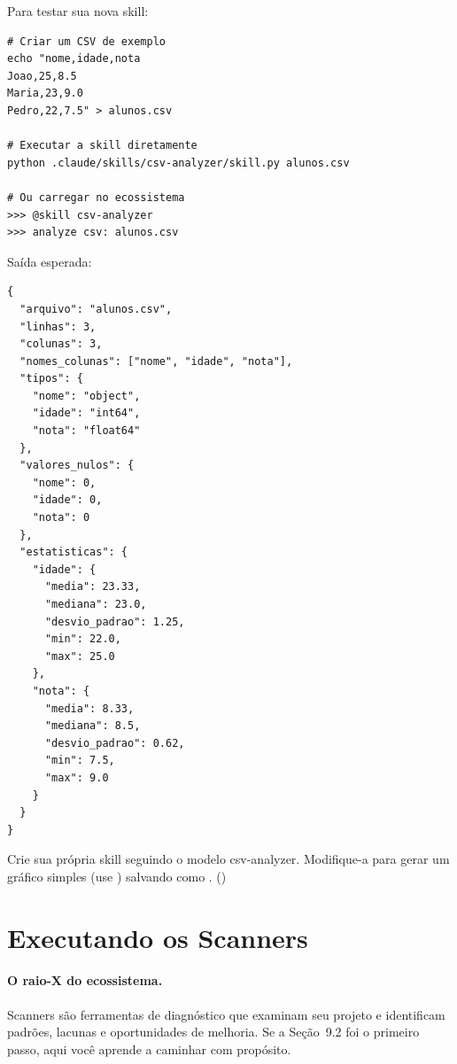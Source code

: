 Para testar sua nova skill:

\begin{lstlisting}[style=bashstyle, caption={Testando a skill csv-analyzer},
label={lst:test-skill}]
# Criar um CSV de exemplo
echo "nome,idade,nota
Joao,25,8.5
Maria,23,9.0
Pedro,22,7.5" > alunos.csv

# Executar a skill diretamente
python .claude/skills/csv-analyzer/skill.py alunos.csv

# Ou carregar no ecossistema
>>> @skill csv-analyzer
>>> analyze csv: alunos.csv
\end{lstlisting}

Saída esperada:

\begin{lstlisting}[style=pythonstyle, caption={Saída da análise do CSV}]
{
  "arquivo": "alunos.csv",
  "linhas": 3,
  "colunas": 3,
  "nomes_colunas": ["nome", "idade", "nota"],
  "tipos": {
    "nome": "object",
    "idade": "int64",
    "nota": "float64"
  },
  "valores_nulos": {
    "nome": 0,
    "idade": 0,
    "nota": 0
  },
  "estatisticas": {
    "idade": {
      "media": 23.33,
      "mediana": 23.0,
      "desvio_padrao": 1.25,
      "min": 22.0,
      "max": 25.0
    },
    "nota": {
      "media": 8.33,
      "mediana": 8.5,
      "desvio_padrao": 0.62,
      "min": 7.5,
      "max": 9.0
    }
  }
}
\end{lstlisting}

\begin{exercicio}
Crie sua própria skill seguindo o modelo csv-analyzer. Modifique-a
para gerar um gráfico simples (use ) salvando
como . (\nivelbasico)
\end{exercicio}

\section{Executando os Scanners}
\label{sec:scanners}
\nivelintermediario

\paragraph{O raio-X do ecossistema.} Scanners são ferramentas de diagnóstico
que examinam seu projeto e identificam padrões, lacunas e oportunidades de
melhoria. Se a Seção~9.2 foi o primeiro passo, aqui você aprende a
caminhar com propósito.

